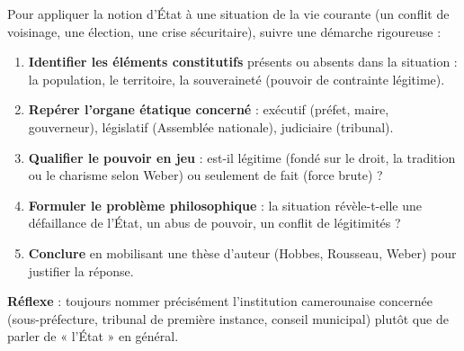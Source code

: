 \documentclass[11pt]{article}
\newcommand{\cle}[1]{{\popxbold\color{popdark}#1}}
\begin{document}
\begin{methode}
Pour appliquer la notion d'État à une situation de la vie courante (un conflit de voisinage, une élection, une crise sécuritaire), suivre une démarche rigoureuse :
\begin{enumerate}
\item \textbf{Identifier les éléments constitutifs} présents ou absents dans la situation : la \cle{population}, le \cle{territoire}, la \cle{souveraineté} (pouvoir de contrainte légitime).
\item \textbf{Repérer l'organe étatique concerné} : exécutif (préfet, maire, gouverneur), législatif (Assemblée nationale), judiciaire (tribunal).
\item \textbf{Qualifier le pouvoir en jeu} : est-il légitime (fondé sur le droit, la tradition ou le charisme selon Weber) ou seulement de fait (force brute) ?
\item \textbf{Formuler le problème philosophique} : la situation révèle-t-elle une défaillance de l'État, un abus de pouvoir, un conflit de légitimités ?
\item \textbf{Conclure} en mobilisant une thèse d'auteur (Hobbes, Rousseau, Weber) pour justifier la réponse.
\end{enumerate}
\textbf{Réflexe} : toujours nommer précisément l'institution camerounaise concernée (sous-préfecture, tribunal de première instance, conseil municipal) plutôt que de parler de « l'État » en général.
\end{methode}
\end{document}
